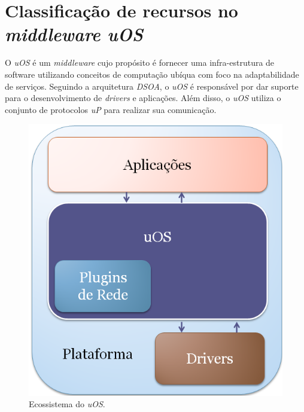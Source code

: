 \section{Classificação de recursos no \emph{middleware uOS}}
\label{sec:classificacaoNoUos}

O \emph{uOS} é um \emph{middleware} cujo propósito é fornecer uma infra-estrutura de software utilizando conceitos de computação ubíqua com foco na adaptabilidade de serviços. Seguindo a arquitetura \emph{DSOA}, o \emph{uOS} é responsável por dar suporte para o desenvolvimento de \emph{drivers} e aplicações. Além disso, o \emph{uOS} utiliza o conjunto de protocolos \emph{uP} para realizar sua comunicação.

\begin{figure}[ht]
	\center
	\includegraphics[scale=0.4]{imagens/ecossistemaUbiquitos}
	\caption{Ecossistema do \emph{uOS}.}
	\label{fig:ecossistemaUbiquitos}
\end{figure}

